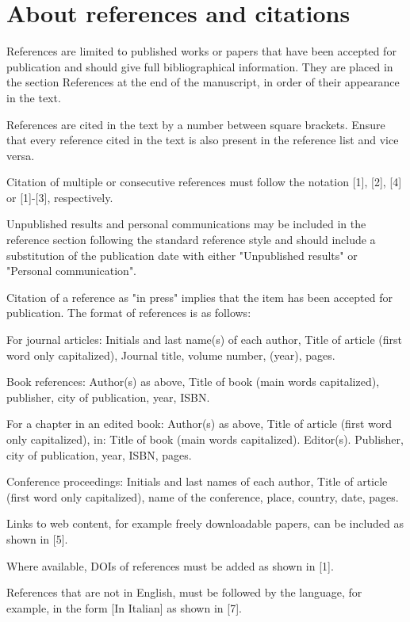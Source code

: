 \documentclass[10pt]{style_src/imeko_acta}
\begin{document}
\section{About references and citations}

References are limited to published works or papers that have been accepted for publication and should give full bibliographical information. They are placed in the section References at the end of the manuscript, in order of their appearance in the text.

References are cited in the text by a number between square brackets. Ensure that every reference cited in the text is also present in the reference list and vice versa.

Citation of multiple or consecutive references must follow the notation [1], [2], [4] or [1]-[3], respectively.

Unpublished results and personal communications may be included in the reference section following the standard reference style and should include a substitution of the publication date with either "Unpublished results" or "Personal communication". 

Citation of a reference as "in press" implies that the item has been accepted for publication.
The format of references is as follows:

\begin{enumerate-a}
	\item For journal articles: Initials and last name(s) of each author, Title of article (first word only capitalized), Journal title, volume number, (year), pages.
	\item Book references: Author(s) as above, Title of book (main words capitalized), publisher, city of publication, year, ISBN. 
	\item For a chapter in an edited book: Author(s) as above, Title of article (first word only capitalized), in: Title of book (main words capitalized). Editor(s). Publisher, city of publication, year, ISBN, pages.
	\item Conference proceedings: Initials and last names of each author, Title of article (first word only capitalized), name of the conference, place, country, date, pages.
	\item Links to web content, for example freely downloadable papers, can be included as shown in [5].
	\item Where available, DOIs of references must be added as shown in [1].
	\item References that are not in English, must be followed by the language, for example, in the form [In Italian] as shown in [7].
\end{enumerate-a}
\end{document}
